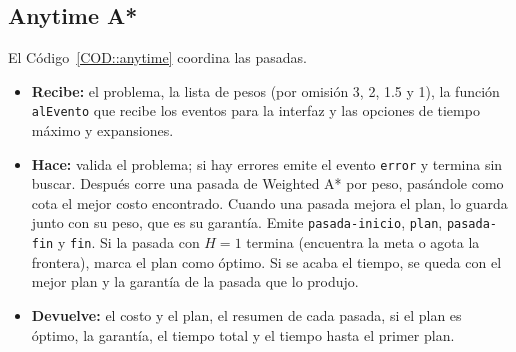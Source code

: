 \subsection{Anytime A*}
El Código~\ref{COD::anytime} coordina las pasadas.
\begin{itemize}
    \item \textbf{Recibe:} el problema, la lista de pesos (por omisión 3, 2, 1.5 y 1), la función \texttt{alEvento} que recibe los eventos para la interfaz y las opciones de tiempo máximo y expansiones.
    \item \textbf{Hace:} valida el problema; si hay errores emite el evento \texttt{error} y termina sin buscar. Después corre una pasada de Weighted A* por peso, pasándole como cota el mejor costo encontrado. Cuando una pasada mejora el plan, lo guarda junto con su peso, que es su garantía. Emite \texttt{pasada-inicio}, \texttt{plan}, \texttt{pasada-fin} y \texttt{fin}. Si la pasada con $H = 1$ termina (encuentra la meta o agota la frontera), marca el plan como óptimo. Si se acaba el tiempo, se queda con el mejor plan y la garantía de la pasada que lo produjo.
    \item \textbf{Devuelve:} el costo y el plan, el resumen de cada pasada, si el plan es óptimo, la garantía, el tiempo total y el tiempo hasta el primer plan.
\end{itemize}


